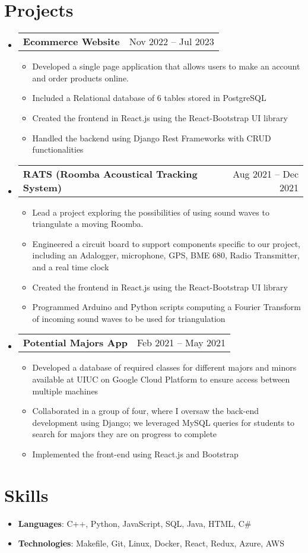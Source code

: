 \documentclass[letterpaper,11pt]{article}
\makeatletter
\newcommand{\resumeItem}[1]{
  \item\small{
    {#1 \vspace{-3pt}}
  }
}
\newcommand{\resumeProjectheading}[2]{
  \vspace{-1pt}\item
    \begin{tabular*}{0.97\textwidth}[t]{l@{\extracolsep{\fill}}r}
      \textbf{#1} & #2 \\
    \end{tabular*}\vspace{-5pt}
}
\newcommand{\resumeSubItem}[2]{\resumeItem{#1}{#2}\vspace{-4pt}}
\newcommand{\resumeSubHeadingListStart}{\begin{itemize}[leftmargin=*]}
\newcommand{\resumeSubHeadingListEnd}{\end{itemize}}
\newcommand{\resumeItemListStart}{\begin{itemize}}
\newcommand{\resumeItemListEnd}{\end{itemize}\vspace{-5pt}}
\makeatother
\begin{document}
\section{Projects}
  \resumeSubHeadingListStart
    \resumeProjectheading
      {Ecommerce Website}{Nov 2022 -- Jul 2023}
      \resumeItemListStart
        \resumeItem{Developed a single page application that allows users to make an account and order products online.}
        \resumeItem{Included a Relational database of 6 tables stored in PostgreSQL }
        \resumeItem{Created the frontend in React.js using the React-Bootstrap UI library}
        \resumeItem{Handled the backend using Django Rest Frameworks with CRUD functionalities}
      \resumeItemListEnd

      \resumeProjectheading
      {RATS (Roomba Acoustical Tracking System)}{Aug 2021 -- Dec 2021}
      \resumeItemListStart
        \resumeItem{Lead a project exploring the possibilities of using sound waves to triangulate a moving Roomba.}
        \resumeItem{Engineered a circuit board to support components specific to our project, including an Adalogger, microphone, GPS, BME 680, Radio Transmitter, and a real time clock}
        \resumeItem{Created the frontend in React.js using the React-Bootstrap UI library}
        \resumeItem{Programmed Arduino and Python scripts computing a Fourier Transform of incoming sound waves to be used for triangulation}
      \resumeItemListEnd

      \resumeProjectheading
      {Potential Majors App}{Feb 2021 -- May 2021}
      \resumeItemListStart
        \resumeItem{Developed a database of required classes for different majors and minors available at UIUC on Google Cloud Platform to ensure access between multiple machines}
        \resumeItem{Collaborated in a group of four, where I oversaw the back-end development using Django; we leveraged MySQL queries for students to search for majors they are on progress to complete}
        \resumeItem{Implemented the front-end using React.js and Bootstrap}
      \resumeItemListEnd
  \resumeSubHeadingListEnd

%
\section{Skills}
 \resumeSubHeadingListStart
   \item{
     \textbf{Languages}{: C++, Python, JavaScript, SQL, Java, HTML, C\#}
    }
  \item{
     \textbf{Technologies}{: Makefile, Git, Linux, Docker, React, Redux, Azure, AWS}
    } 
 \resumeSubHeadingListEnd


\end{document}
